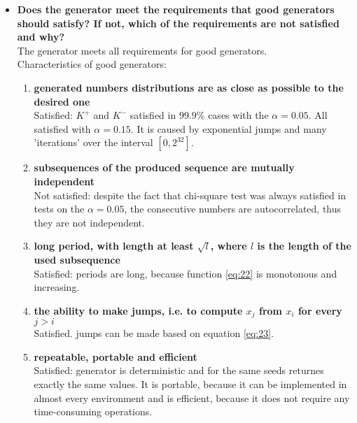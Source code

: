 \documentclass[a4paper,10pt]{article}
\begin{document}
\begin{itemize}
 \item \textbf{Does the generator meet the requirements that good generators should satisfy? If not, which of the requirements are not satisfied and why?} \\
  The generator meets all requirements for good generators. \\
  Characteristics of good generators:
   \begin{enumerate}
    \item \textbf{generated numbers distributions are as close as possible to the desired one} \\
    Satisfied: $K^+$ and $K^-$ satisfied in $99.9\%$ cases with the $\alpha = 0.05$. All satisfied with $\alpha = 0.15$. It is caused by exponential jumps and many 'iterations' over the interval $[0,2^{32}]$.
    \item \textbf{subsequences of the produced sequence are mutually independent} \\
    Not satisfied: despite the fact that chi-square test was always satisfied in tests on the $\alpha = 0.05$, the consecutive numbers are autocorrelated, thus they are not independent.
    \item \textbf{long period, with length at least $\sqrt{l}$, where $l$ is the length of the used subsequence} \\
    Satisfied: periods are long, because function \ref{eq:22} is monotonous and increasing.
    \item \textbf{the ability to make jumps, i.e. to compute $x_j$ from $x_i$ for every $j > i$} \\
    Satisfied. jumps can be made based on equation \ref{eq:23}.
    \item \textbf{repeatable, portable and efficient} \\
    Satisfied: generator is deterministic and for the same seeds returnes exactly the same values. It is portable, because it can be implemented in almost every environment and is efficient, because it does not require any time-consuming operations.   
   \end{enumerate}
 

\end{itemize}
\end{document}
